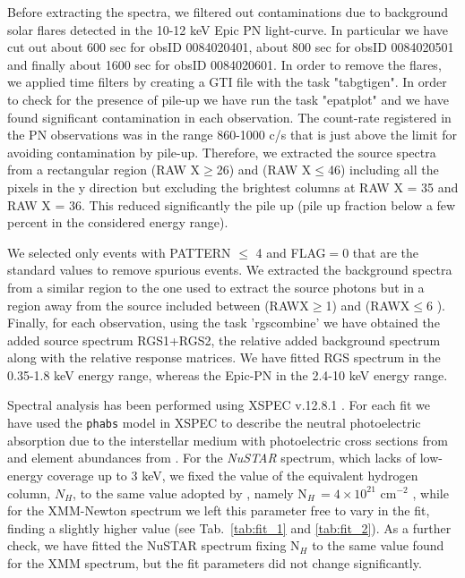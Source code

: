 \documentclass{aa}
\begin{document}
Before extracting the spectra, we filtered out contaminations due
to background solar flares detected in the 10-12 keV Epic PN light-curve.
In particular we have cut out about 600 sec for obsID 0084020401, 
about 800 sec for obsID 0084020501 and finally about 1600 sec for
obsID 0084020601. In order to remove the flares, we applied time 
filters by creating a GTI file with the task "tabgtigen". 
In order to check for the presence of pile-up  we have run the 
task "epatplot" and we have found significant contamination in each 
observation. The count-rate registered in the PN observations was 
in the range 860-1000 c/s that is just above the limit for avoiding 
contamination by pile-up. Therefore, we extracted the source spectra 
from a rectangular region (RAW X$\geq$26) and (RAW X$\leq$46) 
including all the pixels in the y direction but excluding the 
brightest columns at RAW X = 35 and RAW X = 36. This reduced 
significantly the pile up  (pile up fraction below a few percent 
in the considered energy range).
 
We selected only events with PATTERN $\leq$ 4 and FLAG$=$0 that 
are the standard values to remove spurious events. 
We extracted the background spectra from a similar region to the one 
used to extract the source photons but in a region away from the 
source included between (RAWX$\geq$1) and (RAWX$\leq$6 ). Finally,
for each observation, using the task 'rgscombine' we have obtained 
the added source spectrum RGS1+RGS2, the relative added background 
spectrum along with the relative response matrices. We have fitted 
RGS spectrum in the 0.35-1.8 keV energy range, whereas the Epic-PN  
in the 2.4-10 keV energy range.

Spectral analysis has been performed using XSPEC v.12.8.1 \citep{Arnaud:96}.
For each fit we have used the \texttt{phabs} model in XSPEC to 
describe the neutral photoelectric absorption due to the interstellar medium with 
photoelectric cross sections from \citet{Verner.etal:96} and element abundances 
from \citet{Wilms.etal:00}. For the \emph{NuSTAR} spectrum, which lacks of low-
energy coverage up to 3 keV, we fixed the value of the equivalent hydrogen column,
$N_H$, to the same value adopted by \citet{Miller.etal:13}, namely 
N$_{H}\, = 4 \times 10^{21}$ cm$^{-2}$ \citep{Dickey.etal:90}, while for the 
XMM-Newton spectrum we left this parameter free to vary in the fit, finding a 
slightly higher value (see Tab.\ \ref{tab:fit_1} and \ref{tab:fit_2}).
As a further check, we have fitted the NuSTAR spectrum fixing N$_H$ to the same
value found for the XMM spectrum, but the fit parameters did not change
significantly.
\end{document}
